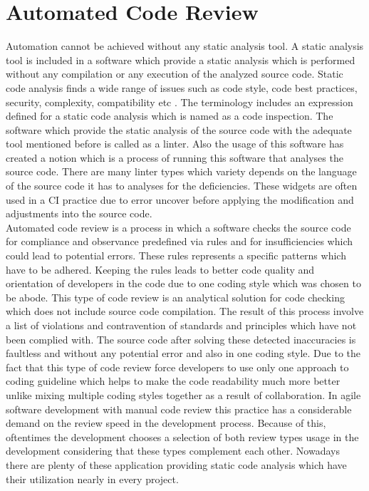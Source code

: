 \section{Automated Code Review}

Automation cannot be achieved without any static analysis tool. A static analysis tool is included in a software which provide a static analysis which is performed without any compilation or any execution of the analyzed source code. Static code analysis finds a wide range of issues such as code style, code best practices, security, complexity, compatibility etc \cite{codacy}. The terminology includes an expression defined for a static code analysis which is named as a code inspection. The software which provide the static analysis of the source code with the adequate tool mentioned before is called as a linter. Also the usage of this software has created a notion  which is a process of running this software that analyses the source code. There are many linter types which variety depends on the language of the source code it has to analyses for the deficiencies. These widgets are often used in a CI practice due to error uncover before applying the modification and adjustments into the source code.\\

Automated code review is a process in which a software checks the source code for compliance and observance predefined via rules and for insufficiencies which could lead to potential errors. These rules represents a specific patterns which have to be adhered. Keeping the rules leads to better code quality and orientation of developers in the code due to one coding style which was chosen to be abode. This type of code review is an analytical solution for code checking which does not include source code compilation. The result of this process involve a list of violations and contravention of standards and principles which have not been complied with. The source code after solving these detected inaccuracies is faultless and without any potential error and also in one coding style. Due to the fact that this type of code review force developers to use only one approach to coding guideline which helps to make the code readability much more better unlike mixing multiple coding styles together as a result of collaboration. In agile software development with manual code review this practice has a considerable demand on the review speed in the development process. Because of this, oftentimes the development chooses a selection of both review types usage in the development considering that these types complement each other. Nowadays there are plenty of these application providing static code analysis which have their utilization nearly in every project.\\

